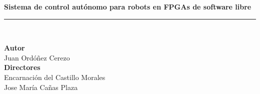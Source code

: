\begin{titlepage}
 
 
\setlength{\centeroffset}{-0.5\oddsidemargin}
\addtolength{\centeroffset}{0.5\evensidemargin}
\thispagestyle{empty}

\noindent\hspace*{\centeroffset}\begin{minipage}{\textwidth}

\centering



 \vspace{3.3cm}

 \vspace{0.5cm}


{\Huge\bfseries  Sistema de
	control autónomo para robots en FPGAs de
	software libre\\
}
\noindent\rule[-1ex]{\textwidth}{3pt}\\[3.5ex]
\end{minipage}

\vspace{2.5cm}
\noindent\hspace*{\centeroffset}\begin{minipage}{\textwidth}
\centering

\textbf{Autor}\\ {Juan Ordóñez Cerezo}\\[2.5ex]
\textbf{Directores}\\
{Encarnación del Castillo Morales\\
Jose María Cañas Plaza}\\[2cm]
\end{minipage}

 
\end{titlepage}



